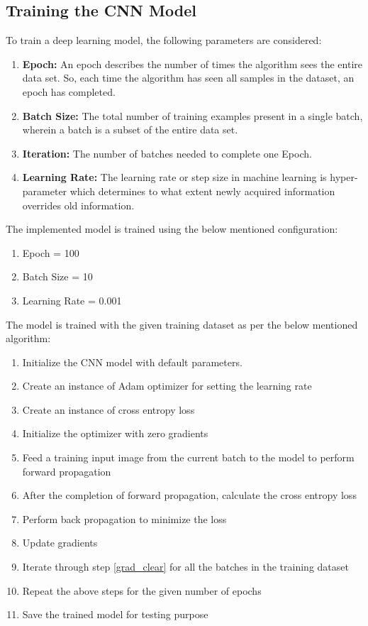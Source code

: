 \documentclass[12pt]{article}
\begin{document}
\subsection{Training the CNN Model}
\label{CNN_train}
To train a deep learning model, the following parameters are considered:
\begin{enumerate}
	\item \textbf{Epoch:} An epoch describes the number of times the algorithm sees the entire data set. So, each time the algorithm has seen all samples in the dataset, an epoch has completed.
	\item \textbf{Batch Size:} The total number of training examples present in a single batch, wherein a batch is a subset of the entire data set. 
	\item \textbf{Iteration:} The number of batches needed to complete one Epoch.
	\item \textbf{Learning Rate:} The learning rate or step size in machine learning is hyper-parameter which determines to what extent newly acquired information overrides old information.	
\end{enumerate}

The implemented model is trained using the below mentioned configuration:
\begin{enumerate}
	\item Epoch = 100	
	\item Batch Size = 10
	\item Learning Rate = 0.001
\end{enumerate}

The model is trained with the given training dataset as per the below mentioned algorithm:
\begin{enumerate}
	\item Initialize the CNN model with default parameters. 
	\item Create an instance of Adam optimizer for setting the learning rate
	\item Create an instance of cross entropy loss
	\item Initialize the optimizer with zero gradients \label{grad_clear}
	\item Feed a training input image from the current batch to the model to perform forward propagation
	\item After the completion of forward propagation, calculate the cross entropy loss
	\item Perform back propagation to minimize the loss
	\item Update gradients
	\item Iterate through step \ref{grad_clear} for all the batches in the training dataset
	\item Repeat the above steps for the given number of epochs
	\item Save the trained model for testing purpose
	
\end{enumerate}
\end{document}
